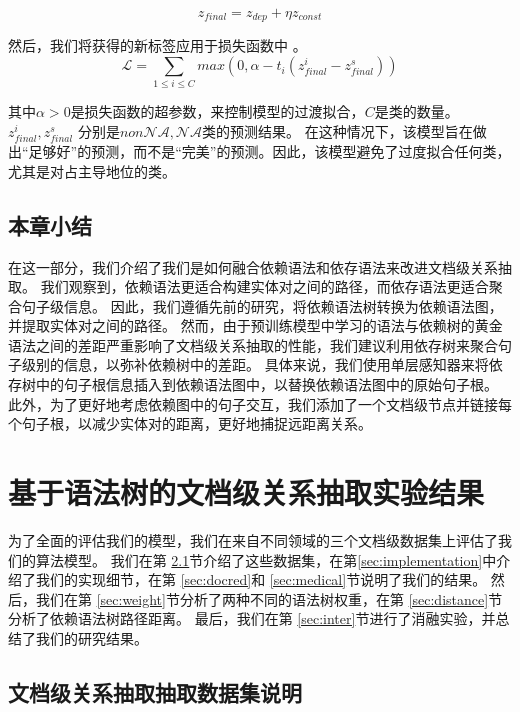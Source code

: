 \documentclass[bachelor]{thesis-uestc}
\begin{document}
\begin{equation}\label{eta}
    z_{final} = z_{dep} + \eta z_{const}
\end{equation}
\par 
然后，我们将获得的新标签应用于损失函数中 \cite{SagDRE}。
\begin{equation}\label{loss}
    \mathcal{L} = \sum_{1 \le i \le C} max(0, \alpha-t_i(z^i_{final} - z^s_{final}))
\end{equation}

其中$\alpha>0$是损失函数的超参数，来控制模型的过渡拟合，$C$是类的数量。$z^i_{final}, z^s_{final}$ 分别是$non\mathcal{NA}, \mathcal{NA}$类的预测结果。
在这种情况下，该模型旨在做出“足够好”的预测，而不是“完美”的预测。因此，该模型避免了过度拟合任何类，尤其是对占主导地位的类。\par

\section{本章小结}
在这一部分，我们介绍了我们是如何融合依赖语法和依存语法来改进文档级关系抽取。
我们观察到，依赖语法更适合构建实体对之间的路径，而依存语法更适合聚合句子级信息。
因此，我们遵循先前的研究，将依赖语法树转换为依赖语法图，并提取实体对之间的路径。
然而，由于预训练模型中学习的语法与依赖树的黄金语法之间的差距严重影响了文档级关系抽取的性能，我们建议利用依存树来聚合句子级别的信息，以弥补依赖树中的差距。
具体来说，我们使用单层感知器来将依存树中的句子根信息插入到依赖语法图中，以替换依赖语法图中的原始句子根。
此外，为了更好地考虑依赖图中的句子交互，我们添加了一个文档级节点并链接每个句子根，以减少实体对的距离，更好地捕捉远距离关系。
\chapter{基于语法树的文档级关系抽取实验结果}
为了全面的评估我们的模型，我们在来自不同领域的三个文档级数据集上评估了我们的算法模型。
我们在第 \ref{sec:dataset}节介绍了这些数据集，在第\ref{sec:implementation}中介绍了我们的实现细节，在第 \ref{sec:docred}和 \ref{sec:medical}节说明了我们的结果。
然后，我们在第 \ref{sec:weight}节分析了两种不同的语法树权重，在第 \ref{sec:distance}节分析了依赖语法树路径距离。
最后，我们在第 \ref{sec:inter}节进行了消融实验，并总结了我们的研究结果。

\section{文档级关系抽取抽取数据集说明}\label{sec:dataset}
\end{document}

